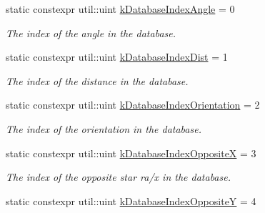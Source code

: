 \begin{DoxyCompactItemize}
\item 
\mbox{\label{classstar__tracker_1_1StarSet_a349d3845bab3180af0e231f7087f1392}} 
static constexpr util\+::uint \hyperlink{classstar__tracker_1_1StarSet_a349d3845bab3180af0e231f7087f1392}{k\+Database\+Index\+Angle} = 0
\begin{DoxyCompactList}\small\item\em The index of the angle in the database. \end{DoxyCompactList}\item 
\mbox{\label{classstar__tracker_1_1StarSet_a5c0911959881ea2fc69fbb47d012505e}} 
static constexpr util\+::uint \hyperlink{classstar__tracker_1_1StarSet_a5c0911959881ea2fc69fbb47d012505e}{k\+Database\+Index\+Dist} = 1
\begin{DoxyCompactList}\small\item\em The index of the distance in the database. \end{DoxyCompactList}\item 
\mbox{\label{classstar__tracker_1_1StarSet_a99ab08fb7db893a6902ec636bf39222c}} 
static constexpr util\+::uint \hyperlink{classstar__tracker_1_1StarSet_a99ab08fb7db893a6902ec636bf39222c}{k\+Database\+Index\+Orientation} = 2
\begin{DoxyCompactList}\small\item\em The index of the orientation in the database. \end{DoxyCompactList}\item 
\mbox{\label{classstar__tracker_1_1StarSet_a6295a2d15d6fc5246081afb609933e78}} 
static constexpr util\+::uint \hyperlink{classstar__tracker_1_1StarSet_a6295a2d15d6fc5246081afb609933e78}{k\+Database\+Index\+OppositeX} = 3
\begin{DoxyCompactList}\small\item\em The index of the opposite star ra/x in the database. \end{DoxyCompactList}\item 
\mbox{\label{classstar__tracker_1_1StarSet_a260894010a086ec832e7b2da6070a6e3}} 
static constexpr util\+::uint \hyperlink{classstar__tracker_1_1StarSet_a260894010a086ec832e7b2da6070a6e3}{k\+Database\+Index\+OppositeY} = 4

\end{DoxyCompactItemize}
